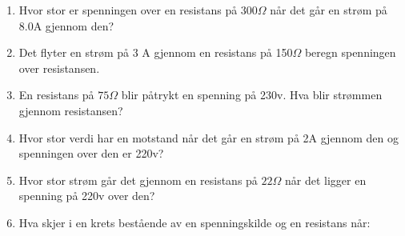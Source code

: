 \documentclass[12pt,a4paper]{article}
\begin{document}
\begin{enumerate}
\item Hvor stor er spenningen over en resistans på $300\Omega$ når det går en strøm på 8.0A gjennom den?
\vskip 5pt 
\vskip 2.5pt 
\item Det flyter en strøm på 3 A gjennom en resistans på 150$\Omega$ beregn spenningen over resistansen. 
\vskip 5pt 
\vskip 2.5pt 
\item En resistans på $75\Omega$ blir påtrykt en spenning på 230v. Hva blir strømmen gjennom resistansen? 
\vskip 5pt 
\vskip 2.5pt 
\item Hvor stor verdi har en motstand når det går en strøm på 2A gjennom den og spenningen over den er 220v? 
\vskip 5pt 
\vskip 2.5pt 
\item Hvor stor strøm går det gjennom en resistans på $22\Omega$ når det ligger en spenning på 220v over den? 
\vskip 5pt 
\vskip 2.5pt 
\item Hva skjer i en krets bestående av en spenningskilde og en resistans når:


\end{enumerate}
\end{document}
